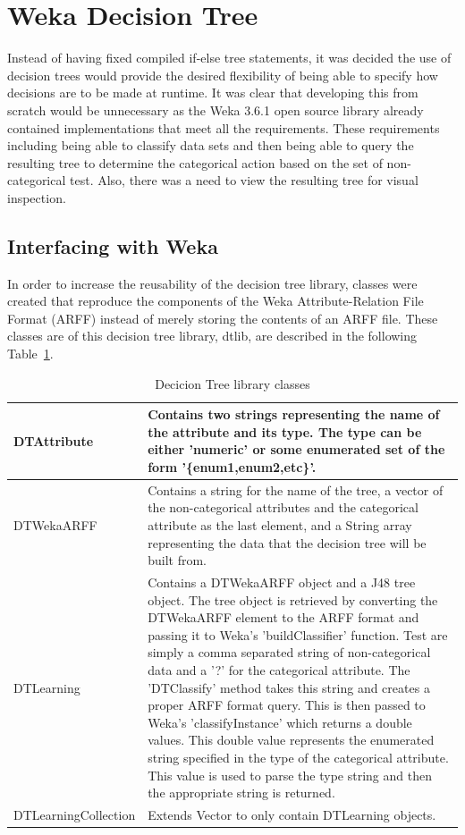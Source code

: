 \section{Weka Decision Tree}
Instead of having fixed compiled if-else tree statements, it was decided the use of decision trees would provide
the desired flexibility of being able to specify how decisions are to be made at runtime.  It was clear that
developing this from scratch would be unnecessary as the Weka 3.6.1\cite{weka} open source library 
already contained implementations that meet all the requirements.  These requirements including 
being able to classify data sets and then being able to query the resulting tree to determine the 
categorical action based on the set of non-categorical test.  Also, there was a need to view the resulting tree 
for visual inspection.

\subsection{Interfacing with Weka}
In order to increase the reusability of the decision tree library, classes were created that 
reproduce the components of the Weka Attribute-Relation File Format (ARFF) instead of merely
storing the contents of an ARFF file.  These classes are of this decision tree library, dtlib, 
are described in the following Table~\ref{table:attribs}.

\begin{table}[h]
\centering
\begin{tabular}{|l|p{5in}|}
\hline
DTAttribute &
Contains two strings representing the name of the attribute and its type.
The type can be either 'numeric' or some enumerated set of the form '\{enum1,enum2,etc\}'.\\
\hline
DTWekaARFF &
Contains a string for the name of the tree, a vector of the non-categorical attributes and the 
categorical attribute as the last element, and a String array representing the data that the 
decision tree will be built from.\\
\hline
DTLearning &
Contains a DTWekaARFF object and a J48 tree object.  The tree object is retrieved by converting
the DTWekaARFF element to the ARFF format and passing it to Weka's 'buildClassifier' function.  
Test are simply a comma separated string of non-categorical data and a '?' for the categorical 
attribute.  The 'DTClassify' method takes this string and creates a proper ARFF format query.
This is then passed to Weka's 'classifyInstance' which returns a double values.  This double value
represents the enumerated string specified in the type of the categorical attribute.  This value is
used to parse the type string and then the appropriate string is returned.  \\
\hline
DTLearningCollection &
Extends Vector to only contain DTLearning objects.\\
\hline
\end{tabular}
\caption{Decicion Tree library classes}
\label{table:attribs}
\end{table}

